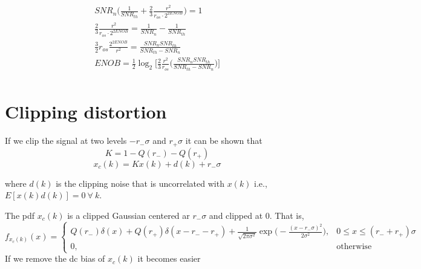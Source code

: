 \documentclass[a4paper]{article}
\begin{document}
\begin{align} \nonumber
SNR_n\bigg(\frac{1}{SNR_{th}} + \frac{2}{3}\frac{r^2}{r_{os}\cdot 2^{2ENOB}}\bigg) = 1 \\
\frac{2}{3}\frac{r^2}{r_{os}\cdot 2^{2ENOB}} = \frac{1}{SNR_n} - \frac{1}{SNR_{th}}  \\
\frac{3}{2}r_{os}\frac{2^{2ENOB}}{r^2} = \frac{SNR_nSNR_{th}}{SNR_{th} - SNR_n}  \\
ENOB= \frac{1}{2}\log_2\bigg[\frac{2}{3}\frac{r^2}{r_{os}}\bigg(\frac{SNR_nSNR_{th}}{SNR_{th} - SNR_n}\bigg)\bigg]  \\
\end{align}

\section{Clipping distortion}
If we clip the signal at two levels $-r_-\sigma$ and $r_+\sigma$ it can be shown that 
\begin{equation}
K = 1 -Q(r_-) - Q(r_+)
\end{equation}
\begin{equation} \label{Bussgangs}
x_c(k) = Kx(k) + d(k) + r_-\sigma
\end{equation}

where  $d(k)$ is the clipping noise that is uncorrelated with $x(k)$ i.e., $E[x(k)d(k)] = 0 ~\forall~k$.

The pdf $x_c(k)$ is a clipped Gaussian centered ar $r_-\sigma$ and clipped at 0. That is,
\begin{equation}
f_{x_c(k)}(x) = \begin{cases}
Q(r_-)\delta(x) + Q(r_+)\delta(x - r_- - r_+) + \frac{1}{\sqrt{2\pi\sigma^2}}\exp\Big(-\frac{(x-r_-\sigma)^2}{2\sigma^2}\Big), & 0 \leq x   \leq (r_- + r_+)\sigma \\
0, & \mathrm{otherwise}
\end{cases}
\end{equation}
If we remove the dc bias of $x_c(k)$ it becomes easier 
\end{document}
